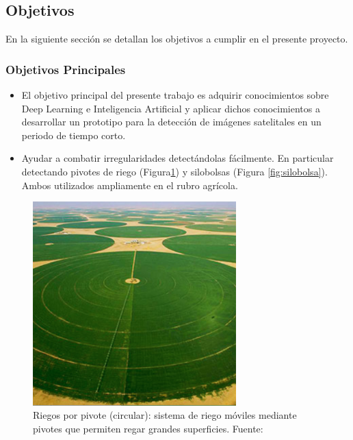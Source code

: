\subsection{Objetivos}
En la siguiente sección se detallan los objetivos a cumplir en el presente proyecto.
\subsubsection{Objetivos Principales}
\begin{itemize}
    \item El objetivo principal del presente trabajo es adquirir conocimientos sobre Deep Learning e Inteligencia Artificial y aplicar dichos conocimientos a desarrollar un prototipo para la detección de imágenes satelitales en un periodo de tiempo corto.\\
    
    \item Ayudar a combatir irregularidades detectándolas fácilmente. En particular detectando pivotes de riego (Figura\ref{fig:pivot}) y silobolsas (Figura \ref{fig:silobolsa}). Ambos utilizados ampliamente en el rubro agrícola.
\end{itemize}

    \begin{figure}
        \centering
        \includegraphics[width=0.7\textwidth]{img/pivot.png}
        \caption{Riegos por pivote (circular): sistema de riego móviles mediante pivotes que permiten regar grandes superficies. Fuente: \cite{img_pivot}}
        \label{fig:pivot}
    \end{figure}
    
